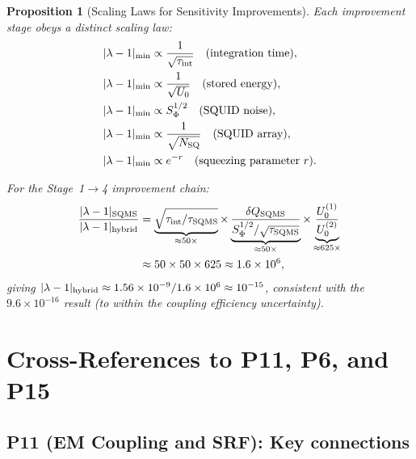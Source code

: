 \documentclass[11pt,twocolumn]{article}
\newcommand{\lam}{\lambda}
\newcommand{\ee}[1]{\times 10^{#1}}
\newtheorem{proposition}[theorem]{Proposition}
\theoremstyle{definition}
\theoremstyle{remark}
\begin{document}
\begin{proposition}[Scaling Laws for Sensitivity Improvements]
\label{prop:scaling}
Each improvement stage obeys a distinct scaling law:
\begin{align}
|\lam-1|_{\rm min} &\propto \frac{1}{\sqrt{\tau_{\rm int}}}
\quad\text{(integration time)}, \label{eq:tau_scaling}\\
|\lam-1|_{\rm min} &\propto \frac{1}{\sqrt{U_0}}
\quad\text{(stored energy)}, \label{eq:U_scaling}\\
|\lam-1|_{\rm min} &\propto S_\Phi^{1/2}
\quad\text{(SQUID noise)}, \label{eq:squid_scaling}\\
|\lam-1|_{\rm min} &\propto \frac{1}{\sqrt{N_{\rm SQ}}}
\quad\text{(SQUID array)}, \label{eq:array_scaling}\\
|\lam-1|_{\rm min} &\propto e^{-r}
\quad\text{(squeezing parameter $r$)}. \label{eq:squeeze_scaling}
\end{align}

For the Stage~1$\to$4 improvement chain:
\begin{align}
\frac{|\lam-1|_{\rm SQMS}}{|\lam-1|_{\rm hybrid}}
&= \underbrace{\sqrt{\tau_{\rm int}/\tau_{\rm SQMS}}}_{\approx 50\times}
\times\underbrace{\frac{\delta Q_{\rm SQMS}}{S_\Phi^{1/2}/\sqrt{\tau_{\rm SQMS}}}}_{\approx 50\times}
\times\underbrace{\frac{U_0^{(1)}}{U_0^{(2)}}}_{\approx 625\times}
\nonumber\\
&\approx 50\times50\times625 \approx 1.6\ee{6},
\label{eq:total_improvement}
\end{align}
giving $|\lam-1|_{\rm hybrid} \approx 1.56\ee{-9}/1.6\ee{6} \approx 10^{-15}$,
consistent with the $9.6\ee{-16}$ result (to within the coupling
efficiency uncertainty).
\end{proposition}

\section{Cross-References to P11, P6, and P15}
\label{sec:cross_refs}

\subsection{P11 (EM Coupling and SRF): Key connections}
\label{sec:p11_xref}
\end{document}
